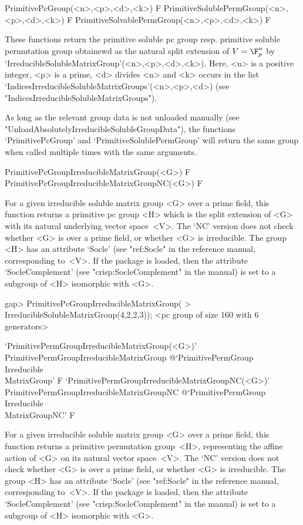 \>PrimitivePcGroup(<n>,<p>,<d>,<k>) F
\>PrimitiveSolublePermGroup(<n>,<p>,<d>,<k>) F
\>PrimitiveSolvablePermGroup(<n>,<p>,<d>,<k>) F

These functions return the primitive soluble pc group resp. primitive soluble 
permutation group obtainewd as the natural split extension of $V = \F_p^n$ by
`IrreducibleSolubleMatrixGroup'(<n>,<p>,<d>,<k>). Here, <n> is a positive 
integer, <p> is a prime, <d> divides <n> and <k> occurs in the list 
`IndicesIrreducibleSolubleMatrixGroups'(<n>,<p>,<d>) 
(see "IndicesIrreducibleSolubleMatrixGroups").

As long as the relevant group data is not unloaded manually 
(see "UnloadAbsolutelyIrreducibleSolubleGroupData"), the functions `PrimitivePcGroup'
and `PrimitiveSolublePermGroup' will return the same group when called multiple times
with the same arguments.


\>PrimitivePcGroupIrreducibleMatrixGroup(<G>) F
\>PrimitivePcGroupIrreducibleMatrixGroupNC(<G>) F

For a given irreducible soluble matrix group <G> over a prime field, this function
returns a primitive pc group <H> which is the split extension of <G> with its natural
underlying vector space~<V>. The `NC' version does not check whether <G> is over a prime field, 
or whether <G> is irreducible. The group <H> has an attribute `Socle' (see "ref:Socle" 
in the {\GAP} reference manual, corresponding to~<V>. If the package {\CRISP} is loaded, 
then the attribute `SocleComplement' (see "crisp:SocleComplement" in the {\CRISP} manual) is set to a subgroup of 
<H> isomorphic with <G>.

\beginexample
gap> PrimitivePcGroupIrreducibleMatrixGroup(
>       IrreducibleSolubleMatrixGroup(4,2,2,3));
<pc group of size 160 with 6 generators>
\endexample

\>`PrimitivePermGroupIrreducibleMatrixGroup(<G>)'%
{PrimitivePermGroupIrreducibleMatrixGroup}%
@{`PrimitivePermGroup\\Irreducible\\MatrixGroup'} F
\>`PrimitivePermGroupIrreducibleMatrixGroupNC(<G>)'%
{PrimitivePermGroupIrreducibleMatrixGroupNC}%
@{`PrimitivePermGroup\\Irreducible\\MatrixGroupNC'} F

For a given irreducible soluble matrix group <G> over a prime field, this function
returns a primitive permutation group~<H>, representing the affine action of <G> on its natural
vector space~<V>. The `NC' version does not check whether <G> is over a prime field, 
or whether <G> is irreducible. The group <H> has an attribute `Socle' (see "ref:Socle" 
in the {\GAP} reference manual, corresponding to~<V>. If the package {\CRISP} is loaded, 
then the attribute `SocleComplement' (see "crisp:SocleComplement" in the {\CRISP} manual) is set to a subgroup of 
<H> isomorphic with <G>.

